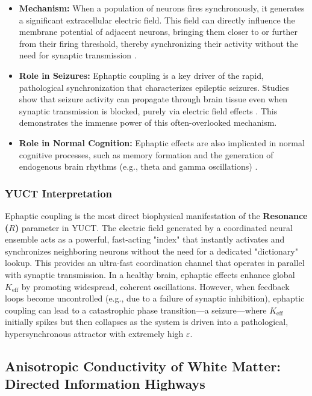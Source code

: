 \documentclass[12pt,a4paper]{article}
\begin{document}
	\begin{itemize}
		\item \textbf{Mechanism:} When a population of neurons fires synchronously, it generates a significant extracellular electric field. This field can directly influence the membrane potential of adjacent neurons, bringing them closer to or further from their firing threshold, thereby synchronizing their activity without the need for synaptic transmission \cite{Frohlich2010}.
		\item \textbf{Role in Seizures:} Ephaptic coupling is a key driver of the rapid, pathological synchronization that characterizes epileptic seizures. Studies show that seizure activity can propagate through brain tissue even when synaptic transmission is blocked, purely via electric field effects \cite{Zhang2022, Dudek1998}. This demonstrates the immense power of this often-overlooked mechanism.
		\item \textbf{Role in Normal Cognition:} Ephaptic effects are also implicated in normal cognitive processes, such as memory formation and the generation of endogenous brain rhythms (e.g., theta and gamma oscillations) \cite{Anastassiou2011}.
	\end{itemize}
	
	\subsubsection*{YUCT Interpretation}
	Ephaptic coupling is the most direct biophysical manifestation of the \textbf{Resonance (\(R\))} parameter in YUCT. The electric field generated by a coordinated neural ensemble acts as a powerful, fast-acting "index" that instantly activates and synchronizes neighboring neurons without the need for a dedicated "dictionary" lookup. This provides an ultra-fast coordination channel that operates in parallel with synaptic transmission. In a healthy brain, ephaptic effects enhance global \(K_{\mathrm{eff}}\) by promoting widespread, coherent oscillations. However, when feedback loops become uncontrolled (e.g., due to a failure of synaptic inhibition), ephaptic coupling can lead to a catastrophic phase transition—a seizure—where \(K_{\mathrm{eff}}\) initially spikes but then collapses as the system is driven into a pathological, hypersynchronous attractor with extremely high \(\varepsilon\).
	
	\subsection{Anisotropic Conductivity of White Matter: Directed Information Highways}
	
\end{document}
